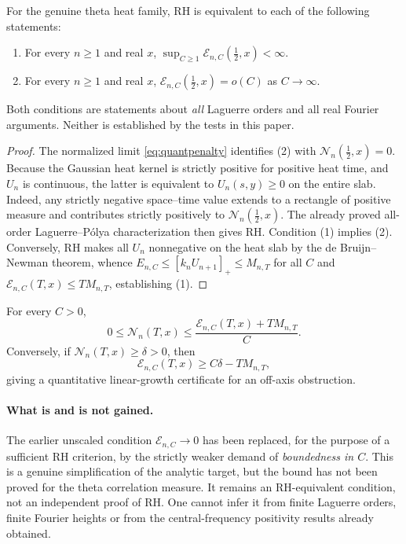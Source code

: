 \begin{corollary}
\label{cor:boundedpenaltyRH}
For the genuine theta heat family, RH
is equivalent to each of the following
statements:
\begin{enumerate}
\item For every $n\ge1$ and real $x$,
$\sup_{C\ge1}\mathcal E_{n,C}(\tfrac12,x)<\infty$.
\item For every $n\ge1$ and real $x$,
$\mathcal E_{n,C}(\tfrac12,x)=o(C)$
as $C\to\infty$.
\end{enumerate}
Both conditions are statements about
\emph{all} Laguerre orders and all real
Fourier arguments. Neither is established
by the tests in this paper.
\end{corollary}
\begin{proof}
The normalized limit
\eqref{eq:quantpenalty} identifies (2)
with $\mathcal N_n(\tfrac12,x)=0$.
Because the Gaussian heat kernel is
strictly positive for positive heat time,
and $U_n$ is continuous, the latter
is equivalent to $U_n(s,y)\ge0$
on the entire slab. Indeed, any strictly
negative space--time value extends to
a rectangle of positive measure and
contributes strictly positively to
$\mathcal N_n(\tfrac12,x)$.
The already proved all-order
Laguerre--P\'olya characterization
then gives RH.
Condition (1) implies (2).
Conversely, RH makes all $U_n$
nonnegative on the heat slab by the
de Bruijn--Newman theorem, whence
$E_{n,C}\le[k_nU_{n+1}]_+\le M_{n,T}$
for all $C$ and
$\mathcal E_{n,C}(T,x)\le TM_{n,T}$,
establishing (1).
\end{proof}

\begin{corollary}
\label{cor:negative-mass}
For every $C>0$,
\[
0\le\mathcal N_n(T,x)
\le\frac{\mathcal E_{n,C}(T,x)
 +T M_{n,T}}{C}.
\]
Conversely, if
$\mathcal N_n(T,x)\ge\delta>0$, then
\[
\mathcal E_{n,C}(T,x)
\ge C\delta-TM_{n,T},
\]
giving a quantitative linear-growth
certificate for an off-axis obstruction.
\end{corollary}

\paragraph{What is and is not gained.}
The earlier unscaled condition
$\mathcal E_{n,C}\to0$ has been
replaced, for the purpose of a
sufficient RH criterion, by the
strictly weaker demand of
\emph{boundedness in $C$}.
This is a genuine simplification of
the analytic target, but the bound
has not been proved for the theta
correlation measure. It remains an
RH-equivalent condition, not an
independent proof of RH.
One cannot infer it from finite
Laguerre orders, finite Fourier
heights or from the central-frequency
positivity results already obtained.

